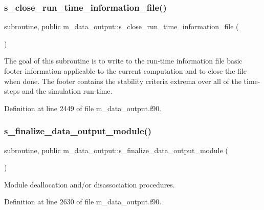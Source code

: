 \subsubsection{\texorpdfstring{s\+\_\+close\+\_\+run\+\_\+time\+\_\+information\+\_\+file()}{s\_close\_run\_time\_information\_file()}}
{\footnotesize\ttfamily subroutine, public m\+\_\+data\+\_\+output\+::s\+\_\+close\+\_\+run\+\_\+time\+\_\+information\+\_\+file (\begin{DoxyParamCaption}{ }\end{DoxyParamCaption})}



The goal of this subroutine is to write to the run-\/time information file basic footer information applicable to the current computation and to close the file when done. The footer contains the stability criteria extrema over all of the time-\/steps and the simulation run-\/time. 



Definition at line 2449 of file m\+\_\+data\+\_\+output.\+f90.

\mbox{\label{namespacem__data__output_a02f2b04a434c1f0ebf9156147d0f976e}} 
\subsubsection{\texorpdfstring{s\+\_\+finalize\+\_\+data\+\_\+output\+\_\+module()}{s\_finalize\_data\_output\_module()}}
{\footnotesize\ttfamily subroutine, public m\+\_\+data\+\_\+output\+::s\+\_\+finalize\+\_\+data\+\_\+output\+\_\+module (\begin{DoxyParamCaption}{ }\end{DoxyParamCaption})}



Module deallocation and/or disassociation procedures. 



Definition at line 2630 of file m\+\_\+data\+\_\+output.\+f90.

\mbox{\label{namespacem__data__output_ab65b312ef83adb104cafafada9c998b6}} 
